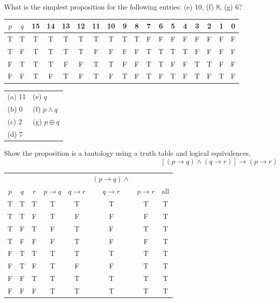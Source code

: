 \documentclass[12pt]{exam}
\begin{document}
\begin{questions}
 What is the simplest proposition for the following entries: (e) 10, (f) 8, (g) 6? \\
 \begin{tabular}{cc|cccc|cccc|cccc|cccc}
    $p$ & $q$ & 15 & 14 & 13 & 12 & 11 & 10 & 9 & 8 & 7 & 6 & 5 & 4 & 3 & 2 & 1 & 0 \\
    \hline
    T & T & T & T & T & T & T & T & T & T & F & F & F & F & F & F & F & F \\
    T & F & T & T & T & T & F & F & F & F & T & T & T & T & F & F & F & F \\
    F & T & T & T & F & F & T & T & F & F & T & T & F & F & T & T & F & F \\
    F & F & T & F & T & F & T & F & T & F & T & F & T & F & T & F & T & F \\
 \end{tabular}
    \begin{solution}
    \begin{tabular}{|ll|}
    \hline
    (a) 11 \hspace{1in}     & (e) $q$ \\
    (b) 0                   & (f) $p \wedge q$ \\
    (c) 2                   & (g) $p \oplus q$\\
    (d) 7 & \\
    \hline
    \end{tabular}
    \end{solution}

\question Show the proposition is a tautology using a truth table
and logical equivalences.
 $$[(p \rightarrow q) \wedge (q \rightarrow r)] \rightarrow (p \rightarrow r)$$
    \begin{solution}

    \begin{tabular}{ccc|ccccc}
         &     &     &          &                          & $(p
         \rightarrow q) \wedge$ & \\
     $p$ & $q$ & $r$ & $p \rightarrow q$ & $q \rightarrow r$ &
     $q \rightarrow r$ & $p \rightarrow r$ &  all \\
     \hline
     T & T & T & T & T & T & T & T\\
     T & T & F & T & F & F & F & T\\
     T & F & T & F & T & F & T & T\\
     T & F & F & F & T & F & F & T\\
     F & T & T & T & T & T & T & T\\
     F & T & F & T & F & F & T & T\\
     F & F & T & T & T & T & T & T\\
     F & F & F & T & T & T & T & T\\
   \end{tabular}


\end{solution}
\end{questions}
\end{document}

